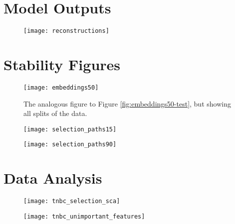 \section{Model Outputs}

\begin{figure}
\texttt{[image: reconstructions]}
\caption{}
\label{fig:reconstructions}
\end{figure}

\section{Stability Figures}

\begin{figure}
  \centering
  \texttt{[image: embeddings50]}
  \caption{The analogous figure to Figure \ref{fig:embeddings50-test}, but
    showing all splits of the data.}
\end{figure}

\begin{figure}
  \centering
  \texttt{[image: selection\_paths15]}
  \caption{}
  \label{fig:}
\end{figure}


\begin{figure}
  \centering
  \texttt{[image: selection\_paths90]}
  \caption{}
  \label{fig:}
\end{figure}

\section{Data Analysis}

\begin{figure}
  \centering
  \texttt{[image: tnbc\_selection\_sca]}
\end{figure}


\begin{figure}
  \centering
  \texttt{[image: tnbc\_unimportant\_features]}
  \label{fig:tnbc_unimportant_features}
\end{figure}
